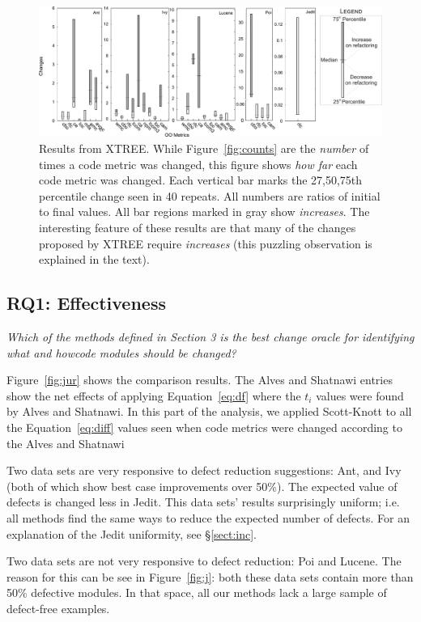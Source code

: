 \documentclass[twocolumn,5p]{elsarticle}
\newcommand{\tion}[1]{\S\ref{sect:#1}}
\newcommand{\fig}[1]{Figure~\ref{fig:#1}}
\newcommand{\eq}[1]{Equation~\ref{eq:#1}}
\theoremstyle{break}
\begin{document}
\begin{itemize}
 
\begin{figure}[!t]
\centering
\includegraphics[width=\linewidth]{figs/changes01.png}
\caption{Results  from XTREE.
While \fig{counts} are the {\em number} of times a code metric was changed,
this  figure shows {\em how far} each code metric was changed. Each vertical bar
marks the 27,50,75th percentile change seen in 40 repeats.
All numbers are ratios of initial to final values.
All bar regions marked in gray show {\em increases}.
The interesting feature of these results are that many
of the changes proposed by XTREE require {\em increases}
(this puzzling observation is explained in the text).}
\label{fig:changes}
\end{figure}



\subsection{RQ1: Effectiveness}

{\em Which of the methods defined in Section 3 is the best change oracle for identifying what and howcode modules should be changed? }

\fig{jur} shows the comparison results.  The Alves and Shatnawi
entries show the net effects of applying \eq{df} where the $t_i$ values were found by Alves and Shatnawi.
 In this part of the  analysis,
we applied Scott-Knott to all the \eq{diff} values
seen when code metrics were changed
according to the  Alves and Shatnawi


Two data sets are very responsive to defect reduction suggestions:
 Ant, and Ivy (both of which show best case improvements over 50\%).
 The  expected value of defects  
 is changed less in Jedit. This data sets' results
 surprisingly uniform; i.e.   all methods
 find the same ways to reduce the expected number of
defects.   For an explanation of the Jedit uniformity, see \tion{inc}.

Two data sets are not very responsive to defect reduction:
Poi and Lucene. The reason for this can be see in \fig{j}:
both these data sets contain more than 50\% defective modules.
In that space, all our  methods lack a large sample of
defect-free examples. 


\end{itemize}
\end{document}
